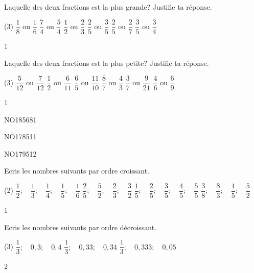 \documentclass[a4paper,12pt]{report}
\begin{document}
\newpage

\begin{exo}{
Laquelle des deux fractions est la plus grande? Justifie ta réponse.
\begin{tasks}(3)
\task $\dfrac{1}{8}$ ou $\dfrac{1}{6}$
\task $\dfrac{7}{4}$ ou $\dfrac{5}{4}$
\task $\dfrac{1}{2}$ ou $\dfrac{2}{3}$
\task $\dfrac{2}{5}$ ou $\dfrac{3}{5}$
\task $\dfrac{2}{5}$ ou $\dfrac{2}{7}$
\task $\dfrac{3}{5}$ ou $\dfrac{3}{4}$
\end{tasks}
}{1}\end{exo}

\begin{exo}{
Laquelle des deux fractions est la plus petite? Justifie ta réponse.

\begin{tasks}(3)
\task $\dfrac{5}{12}$ ou $\dfrac{7}{12}$
\task $\dfrac{1}{2}$ ou $\dfrac{6}{11}$
\task $\dfrac{6}{5}$ ou $\dfrac{11}{10}$
\task $\dfrac{8}{7}$ ou $\dfrac{4}{3}$
\task $\dfrac{3}{7}$ ou $\dfrac{9}{21}$
\task $\dfrac{4}{6}$ ou $\dfrac{6}{9}$
\end{tasks}
}{1}\end{exo}


\begin{exof}{NO185}{68}{1}
\end{exof}
\begin{exol}{NO178}{51}{1}
\end{exol}
\begin{exol}{NO179}{51}{2}
\end{exol}

\begin{exo}{
Ecris les nombres suivants par ordre croissant.
\begin{tasks}(2)
\task $\dfrac{1}{2} ;\quad \dfrac{1}{3} ;\quad \dfrac{1}{4} ;\quad \dfrac{1}{5} ;\quad \dfrac{1}{6}$
\task $\dfrac{2}{5} ;\quad \dfrac{5}{2} ;\quad \dfrac{2}{3} ;\quad \dfrac{3}{2}$
\task $\dfrac{1}{5} ;\quad \dfrac{2}{5} ;\quad \dfrac{3}{5} ;\quad \dfrac{4}{5} ;\quad \dfrac{5}{5}$
\task $\dfrac{3}{8} ;\quad \dfrac{8}{3} ;\quad \dfrac{1}{5} ;\quad \dfrac{5}{2}$
\end{tasks}
}{1}\end{exo}

\begin{exo}{
Ecris les nombres suivants par ordre décroissant.
\begin{tasks}(3)
\task $\dfrac{1}{3} ;\quad 0,3 ;\quad 0,4$
\task $\dfrac{1}{3} ;\quad 0,33 ;\quad 0,34$
\task $\dfrac{1}{3} ;\quad 0,333 ;\quad 0,05$
\end{tasks}
}{2}\end{exo}
\end{document}
